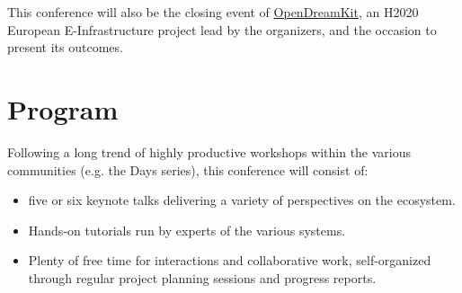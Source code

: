 \documentclass[12pt]{amsart}
\begin{document}
This conference will also be the closing event of
\href{opendreamkit.org}{OpenDreamKit}, an H2020 European
E-Infrastructure project lead by the organizers, and the occasion to
present its outcomes.


\section*{Program}

Following a long trend of highly productive workshops within the
various communities (e.g. the \Sage Days series), this conference will consist of:
\begin{itemize}
\item five or six keynote talks delivering a variety of perspectives on the
  ecosystem.
\item Hands-on tutorials run by experts of the various systems.
\item Plenty of free time for interactions and collaborative work,
  self-organized through regular project planning sessions and
  progress reports.
\end{itemize}
\end{document}
